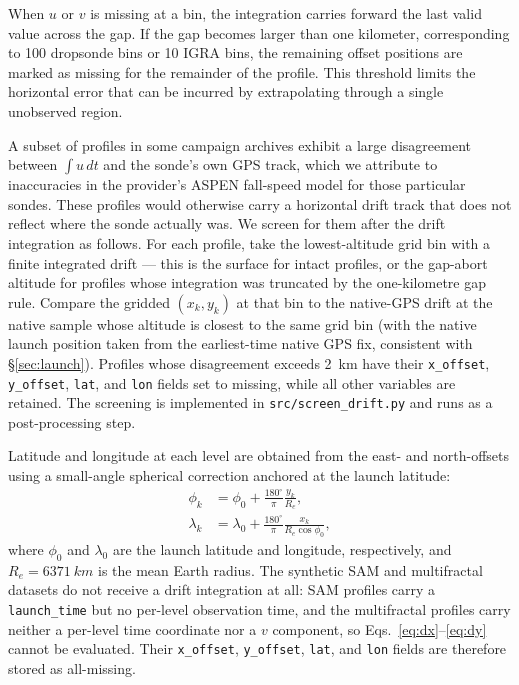 \documentclass[11pt]{article}
\begin{document}
When $u$ or $v$ is missing at a bin, the integration carries forward the last valid value across the gap. If the gap becomes larger than one kilometer, corresponding to 100 dropsonde bins or 10 IGRA bins, the remaining offset positions are marked as missing for the remainder of the profile. This threshold limits the horizontal error that can be incurred by extrapolating through a single unobserved region.

A subset of profiles in some campaign archives exhibit a large disagreement between $\int u\,dt$ and the sonde's own GPS track, which we attribute to inaccuracies in the provider's ASPEN fall-speed model for those particular sondes.  These profiles would otherwise carry a horizontal drift track that does not reflect where the sonde actually was.  We screen for them after the drift integration as follows.  For each profile, take the lowest-altitude grid bin with a finite integrated drift --- this is the surface for intact profiles, or the gap-abort altitude for profiles whose integration was truncated by the one-kilometre gap rule.  Compare the gridded $(x_k, y_k)$ at that bin to the native-GPS drift at the native sample whose altitude is closest to the same grid bin (with the native launch position taken from the earliest-time native GPS fix, consistent with \S\ref{sec:launch}).  Profiles whose disagreement exceeds \SI{2}{km} have their \texttt{x\_offset}, \texttt{y\_offset}, \texttt{lat}, and \texttt{lon} fields set to missing, while all other variables are retained.  The screening is implemented in \texttt{src/screen\_drift.py} and runs as a post-processing step.

Latitude and longitude at each level are obtained from the east- and north-offsets using a small-angle spherical correction anchored at the launch latitude:
\begin{align}
    \phi_k &= \phi_0 + \frac{180^\circ}{\pi}\frac{y_k}{R_e}, \label{eq:lat} \\
    \lambda_k &= \lambda_0 + \frac{180^\circ}{\pi}\frac{x_k}{R_e \cos\phi_0}, \label{eq:lon}
\end{align}
where $\phi_0$ and $\lambda_0$ are the launch latitude and longitude, respectively, and $R_e = \SI{6371}{km}$ is the mean Earth radius.  The synthetic SAM and multifractal datasets do not receive a drift integration at all: SAM profiles carry a \texttt{launch\_time} but no per-level observation time, and the multifractal profiles carry neither a per-level time coordinate nor a $v$ component, so Eqs.~\ref{eq:dx}--\ref{eq:dy} cannot be evaluated.  Their \texttt{x\_offset}, \texttt{y\_offset}, \texttt{lat}, and \texttt{lon} fields are therefore stored as all-missing.
\end{document}
